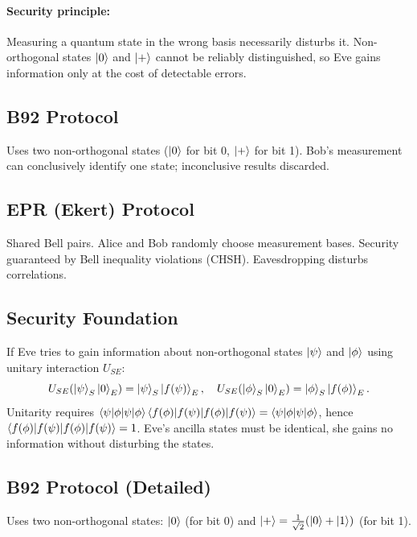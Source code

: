 \documentclass[10pt,a4paper]{article}
\begin{document}
\paragraph{Security principle:} Measuring a quantum state in the wrong basis necessarily disturbs it. Non-orthogonal states $\ket{0}$ and $\ket{+}$ cannot be reliably distinguished, so Eve gains information only at the cost of detectable errors.

\subsection{B92 Protocol}

Uses two non-orthogonal states ($\ket{0}$ for bit 0, $\ket{+}$ for bit 1). Bob's measurement can conclusively identify one state; inconclusive results discarded.

\subsection{EPR (Ekert) Protocol}

Shared Bell pairs. Alice and Bob randomly choose measurement bases. Security guaranteed by Bell inequality violations (CHSH). Eavesdropping disturbs correlations.

\subsection{Security Foundation}

\begin{tcolorbox}[propstyle, title={Theorem: Impossibility of Distinguishing Non-Orthogonal States}]
If Eve tries to gain information about non-orthogonal states $\ket{\psi}$ and $\ket{\phi}$ using unitary interaction $U_{SE}$:
\[
U_{SE}(\ket{\psi}_S\ket{0}_E)=\ket{\psi}_S\ket{f(\psi)}_E,\quad U_{SE}(\ket{\phi}_S\ket{0}_E)=\ket{\phi}_S\ket{f(\phi)}_E.
\]
Unitarity requires $\braket{\psi|\phi}\braket{f(\phi)|f(\psi)}=\braket{\psi|\phi}$, hence $\braket{f(\phi)|f(\psi)}=1$. Eve's ancilla states must be identical, she gains no information without disturbing the states.
\end{tcolorbox}

\subsection{B92 Protocol (Detailed)}

Uses two non-orthogonal states: $\ket{0}$ (for bit 0) and $\ket{+}=\frac{1}{\sqrt{2}}(\ket{0}+\ket{1})$ (for bit 1).
\end{document}

